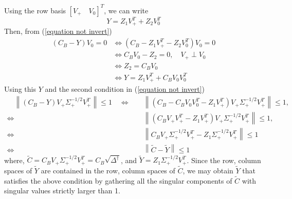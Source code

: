 \documentclass[11pt]{article}
\newcommand{\norm}[1]{\left\|#1\right\|}
\begin{document}
Using the row basis  $[V_+ \quad V_0]^T$, we can write
\[Y = Z_1V_+^T + Z_2V_0^T\]
Then, from (\ref{equation not invert})
\begin{align*}
(C_B - Y)V_0 = 0 & \iff (C_B - Z_1V_+^T - Z_2V_0^T)V_0 = 0\\
& \iff C_BV_0 - Z_2 = 0, \quad V_+ \perp V_0\\
& \iff Z_2 = C_BV_0\\
& \iff Y = Z_1V_+^T + C_BV_0V_0^T
\end{align*}
Using this $Y$ and the second condition in (\ref{equation not invert})
\begin{align*}
\quad \norm{\left( {C}_B - {Y} \right) V_+ {\Sigma}^{-1/2}_+V_+^T } \leq 1 \quad \iff & \quad \norm{\left( {C}_B - C_BV_0V_0^T - Z_1V_+^T \right) V_+ {\Sigma}^{-1/2}_+V_+^T } \leq 1,\\
\iff & \quad \norm{\left(C_BV_+V_+^T - Z_1V_+^T \right) V_+ {\Sigma}^{-1/2}_+V_+^T } \leq 1,\\
\iff & \quad \norm{C_BV_+{\Sigma}^{-1/2}_+V_+^T  - Z_1{\Sigma}^{-1/2}_+V_+^T } \leq 1\\
\iff & \quad \norm{\tilde{C} - \tilde{Y}} \leq 1
\end{align*}
where, \quad $\tilde{C} = C_BV_+{\Sigma}^{-1/2}_+V_+^T = C_B \sqrt{\Delta^{\dagger}}$, \quad and \quad $\tilde{Y} = Z_1{\Sigma}^{-1/2}_+V_+^T$.
Since the row, column spaces of $\tilde Y$ are contained in the row, column spaces of $\tilde C$, we may obtain $\tilde{Y}$ that satisfies the above condition by gathering all the singular components of $\tilde{C}$ with singular values strictly larger than 1. 
\end{document}
